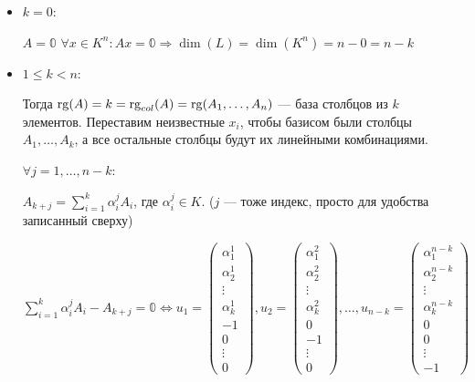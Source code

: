 \prooff{} 
\begin{itemize}
    \item \(k = 0\):

          \(A = \mathbb{0}\) \(\forall x \in K^n: Ax = \mathbb{0} \Rightarrow \dim(L) = \dim(K^n) = n - 0 = n - k\)

    \item \(1\leq k < n\):

          Тогда \(\operatorname{rg}(A) = k = \operatorname{rg}_{col}(A) = \operatorname{rg}(A_1, \ldots, A_n)\) --- база столбцов из \(k\) элементов. Переставим неизвестные $x_i$, чтобы базисом были столбцы \(A_1,\ldots, A_k\), а все остальные столбцы будут их линейными комбинациями.

          $\forall j = 1, \ldots, n-k:$
          
          \(A_{k + j} = \sum\limits_{i = 1}^k \alpha_i^j A_i\), где \(\alpha_i^j \in K\). (\(j\) --- тоже индекс, просто для удобства записанный сверху)

          \(\sum\limits_{i = 1}^k \alpha_i^j A_i - A_{k + j} = \mathbb{0} \Leftrightarrow
          u_1 = \begin{pmatrix}
              \alpha_1^1 \\
              \alpha_2^1 \\
              \vdots     \\
              \alpha_k^1 \\
              -1         \\
              0          \\
              \vdots     \\
              0
          \end{pmatrix},
          u_2 = \begin{pmatrix}
              \alpha_1^2 \\
              \alpha_2^2 \\
              \vdots     \\
              \alpha_k^2 \\
              0          \\
              -1         \\
              \vdots     \\
              0
          \end{pmatrix}, \ldots,
          u_{n - k} = \begin{pmatrix}
              \alpha_1^{n - k} \\
              \alpha_2^{n - k} \\
              \vdots           \\
              \alpha_k^{n - k} \\
              0                \\
              0                \\
              \vdots           \\
              -1
          \end{pmatrix}\)


\end{itemize}
